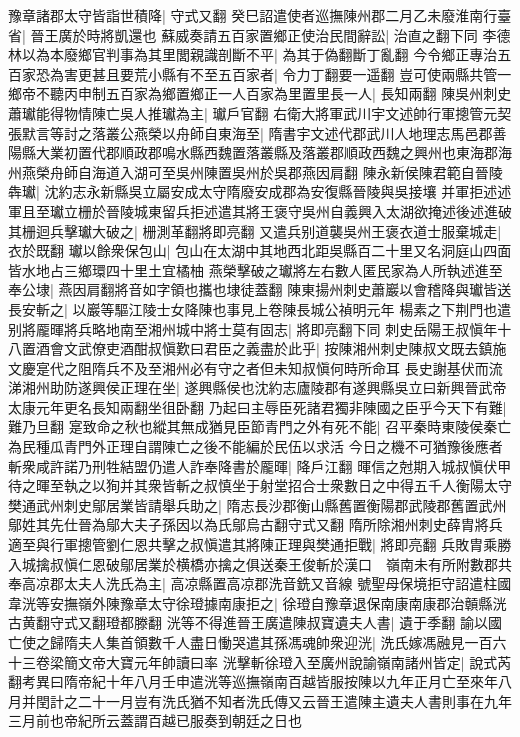 豫章諸郡太守皆詣世積降|{
	守式又翻}
癸巳詔遣使者巡撫陳州郡二月乙未廢淮南行臺省|{
	晉王廣於時將凱還也}
蘇威奏請五百家置鄉正使治民間辭訟|{
	治直之翻下同}
李德林以為本廢鄉官判事為其里閭親識剖斷不平|{
	為其于偽翻斷丁亂翻}
今令鄉正專治五百家恐為害更甚且要荒小縣有不至五百家者|{
	令力丁翻要一遥翻}
豈可使兩縣共管一鄉帝不聽丙申制五百家為鄉置鄉正一人百家為里置里長一人|{
	長知兩翻}
陳吳州刺史蕭瓛能得物情陳亡吳人推瓛為主|{
	瓛戶官翻}
右衛大將軍武川宇文述帥行軍摠管元契張默言等討之落叢公燕榮以舟師自東海至|{
	隋書宇文述代郡武川人地理志馬邑郡善陽縣大業初置代郡順政郡鳴水縣西魏置落叢縣及落叢郡順政西魏之興州也東海郡海州燕榮舟師自海道入湖可至吳州陳置吳州於吳郡燕因肩翻}
陳永新侯陳君範自晉陵犇瓛|{
	沈約志永新縣吳立屬安成太守隋廢安成郡為安復縣晉陵與吳接壤}
并軍拒述述軍且至瓛立栅於晉陵城東留兵拒述遣其將王褒守吳州自義興入太湖欲掩述後述進破其栅迴兵擊瓛大破之|{
	栅測革翻將即亮翻}
又遣兵别道襲吳州王褒衣道士服棄城走|{
	衣於既翻}
瓛以餘衆保包山|{
	包山在太湖中其地西北距吳縣百二十里又名洞庭山四面皆水地占三鄉環四十里土宜橘柚}
燕榮擊破之瓛將左右數人匿民家為人所執述進至奉公埭|{
	燕因肩翻將音如字領也攜也埭徒蓋翻}
陳東揚州刺史蕭巖以會稽降與瓛皆送長安斬之|{
	以巖等驅江陵士女降陳也事見上卷陳長城公禎明元年}
楊素之下荆門也遣别將龎暉將兵略地南至湘州城中將士莫有固志|{
	將即亮翻下同}
刺史岳陽王叔愼年十八置酒會文武僚吏酒酣叔愼歎曰君臣之義盡於此乎|{
	按陳湘州刺史陳叔文既去鎮施文慶寔代之阻隋兵不及至湘州必有守之者但未知叔愼何時所命耳}
長史謝基伏而流涕湘州助防遂興侯正理在坐|{
	遂興縣侯也沈約志廬陵郡有遂興縣吳立曰新興晉武帝太康元年更名長知兩翻坐徂卧翻}
乃起曰主辱臣死諸君獨非陳國之臣乎今天下有難|{
	難乃旦翻}
寔致命之秋也縱其無成猶見臣節青門之外有死不能|{
	召平秦時東陵侯秦亡為民種瓜青門外正理自謂陳亡之後不能編於民伍以求活}
今日之機不可猶豫後應者斬衆咸許諾乃刑牲結盟仍遣人詐奉降書於龎暉|{
	降戶江翻}
暉信之尅期入城叔愼伏甲待之暉至執之以狥并其衆皆斬之叔慎坐于射堂招合士衆數日之中得五千人衡陽太守樊通武州刺史鄔居業皆請舉兵助之|{
	隋志長沙郡衡山縣舊置衡陽郡武陵郡舊置武州鄔姓其先仕晉為鄔大夫子孫因以為氏鄔烏古翻守式又翻}
隋所除湘州刺史薛胄將兵適至與行軍摠管劉仁恩共擊之叔愼遣其將陳正理與樊通拒戰|{
	將即亮翻}
兵敗胄乘勝入城擒叔愼仁恩破鄔居業於横橋亦擒之俱送秦王俊斬於漢口　嶺南未有所附數郡共奉高凉郡太夫人洗氏為主|{
	高凉縣置高凉郡洗音銑又音線}
號聖母保境拒守詔遣柱國韋洸等安撫嶺外陳豫章太守徐璒據南康拒之|{
	徐璒自豫章退保南康南康郡治贑縣洸古黄翻守式又翻璒都滕翻}
洸等不得進晉王廣遣陳叔寶遺夫人書|{
	遺于季翻}
諭以國亡使之歸隋夫人集首領數千人盡日慟哭遣其孫馮魂帥衆迎洸|{
	洗氏嫁馮融見一百六十三卷梁簡文帝大寶元年帥讀曰率}
洸擊斬徐璒入至廣州說諭嶺南諸州皆定|{
	說式芮翻考異曰隋帝紀十年八月壬申遣洸等巡撫嶺南百越皆服按陳以九年正月亡至來年八月并閏計之二十一月豈有洗氏猶不知者洗氏傳又云晉王遣陳主遺夫人書則事在九年三月前也帝紀所云蓋謂百越已服奏到朝廷之日也}
